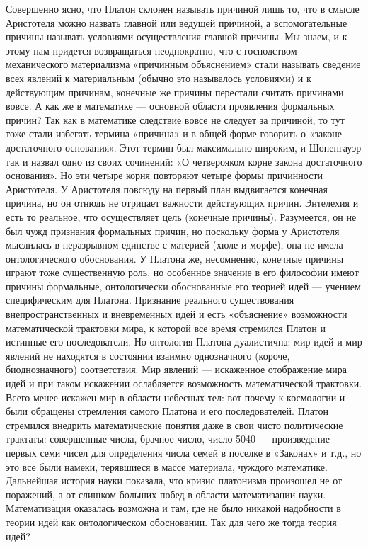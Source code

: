 Совершенно ясно, что Платон склонен называть причиной лишь то, что в
смысле Аристотеля можно назвать главной или ведущей причиной, а
вспомогательные причины называть условиями осуществления главной
причины. Мы знаем, и к этому нам придется возвращаться неоднократно,
что с господством механического материализма «причинным объяснением»
стали называть сведение всех явлений к материальным (обычно это
называлось условиями) и к действующим причинам, конечные же причины
перестали считать причинами вовсе. А как же в математике --- основной
области проявления формальных причин? Так как в математике следствие
вовсе не следует за причиной, то тут тоже стали избегать термина
«причина» и в общей форме говорить о «законе достаточного основания».
Этот термин был максимально широким, и Шопенгауэр так и назвал одно из
своих сочинений: «О четверояком корне закона достаточного основания».
Но эти четыре корня повторяют четыре формы причинности Аристотеля. У
Аристотеля повсюду на первый план выдвигается конечная причина, но он
отнюдь не отрицает важности действующих причин. Энтелехия и есть то
реальное, что осуществляет цель (конечные причины). Разумеется, он не
был чужд признания формальных причин, но поскольку форма у Аристотеля
мыслилась в неразрывном единстве с материей (хюле и морфе), она не
имела онтологического обоснования. У Платона же, несомненно, конечные
причины играют тоже существенную роль, но особенное значение в его
философии имеют причины формальные, онтологически обоснованные его
теорией идей --- учением специфическим для Платона. Признание
реального существования внепространственных и вневременных идей и есть
«объяснение» возможности математической трактовки мира, к которой все
время стремился Платон и истинные его последователи. Но онтология
Платона дуалистична: мир идей и мир явлений не находятся в состоянии
взаимно однозначного (короче, биоднозначного) соответствия. Мир
явлений --- искаженное отображение мира идей и при таком искажении
ослабляется возможность математической трактовки. Всего менее искажен
мир в области небесных тел: вот почему к космологии и были обращены
стремления самого Платона и его последователей. Платон стремился
внедрить математические понятия даже в свои чисто политические
трактаты: совершенные числа, брачное число, число 5040 ---
произведение первых семи чисел для определения числа семей в поселке в
«Законах» и т.д., но это все были намеки, терявшиеся в массе
материала, чуждого математике. Дальнейшая история науки показала, что
кризис платонизма произошел не от поражений, а от слишком больших
побед в области математизации науки. Математизация оказалась возможна
и там, где не было никакой надобности в теории идей как онтологическом
обосновании. Так для чего же тогда теория идей?

